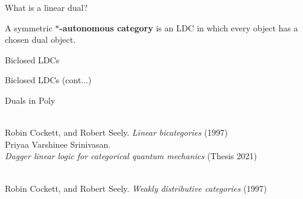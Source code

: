 \documentclass[aspectratio=169]{beamer}
\begin{document}
\begin{frame}{What is a linear dual?}
    \vspace{0.5em}
    
    A symmetric {\bf $*$-autonomous category} is an LDC in which every object has a chosen dual object.
        
\end{frame}

\begin{frame}{Biclosed LDCs}
    
\end{frame}

\begin{frame}{Biclosed LDCs (cont...)}
    
\end{frame}

\begin{frame}{Duals in Poly}
    
\end{frame}


\begin{frame}
    \begingroup  
        \flushleft
        {\selectfont\hspace{2 cm}\Large\bfseries\color{black}{Linear monoids and linear comonoids}}\vspace{1em}\\
        \hspace{2 cm} Robin Cockett, and Robert Seely. {\em Linear bicategories} (1997) \\
        \hspace{2 cm} Priyaa Varshinee Srinivasan. \\
        \hspace{2.5 cm} {\em Dagger linear logic for categorical quantum mechanics} (Thesis 2021) \\
    \endgroup
\end{frame}

\begin{frame}

    \begingroup  
        \flushleft
        {\selectfont\hspace{2 cm}\Large\bfseries\color{black}{Linear bialgebras}}\vspace{1em} \\
        \hspace{2 cm} Robin Cockett, and Robert Seely. {\em Weakly distributive categories} (1997) \\
    \endgroup
\end{frame}
\end{document}
